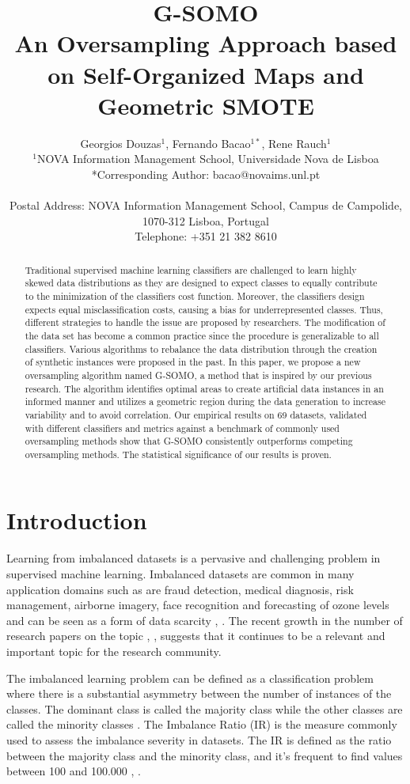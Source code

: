 \documentclass[parskip=full]{scrartcl}
\title{G-SOMO \\ \LARGE{An Oversampling Approach based on Self-Organized Maps and Geometric SMOTE}}
\author{
	Georgios Douzas\(^{1}\), Fernando Bacao\(^{1*}\), Rene Rauch\(^{1}\)
	\\
	\small{\(^{1}\)NOVA Information Management School, Universidade Nova de Lisboa}
	\\
	\small{*Corresponding Author: bacao@novaims.unl.pt}
	\\
	\\
	\small{Postal Address: NOVA Information Management School, Campus de Campolide, 1070-312 Lisboa, Portugal}
	\\
	\small{Telephone: +351 21 382 8610}
}
\date{}
\begin{document}
\maketitle

\begin{abstract}
Traditional supervised machine learning classifiers are challenged to learn
highly skewed data distributions as they are designed to expect classes to
equally contribute to the minimization of the classifiers cost function.
Moreover, the classifiers design expects equal misclassification costs, causing
a bias for underrepresented classes. Thus, different strategies to handle the
issue are proposed by researchers. The modification of the data set has become a
common practice since the procedure is generalizable to all classifiers. Various
algorithms to rebalance the data distribution through the creation of synthetic
instances were proposed in the past.  In this paper, we propose a new
oversampling algorithm named G-SOMO, a method that is inspired by our previous
research. The algorithm identifies optimal areas to create artificial data
instances in an informed manner and utilizes a geometric region during the data
generation to increase variability and to avoid correlation. Our empirical
results on 69 datasets, validated with different classifiers and metrics against
a benchmark of commonly used oversampling methods show that G-SOMO consistently
outperforms competing oversampling methods. The statistical significance of our
results is proven. 
\end{abstract}

\section{Introduction}

Learning from imbalanced datasets is a pervasive and challenging problem in
supervised machine learning. Imbalanced datasets are common in many application
domains such as are fraud detection, medical diagnosis, risk management,
airborne imagery, face recognition and forecasting of ozone levels and can be
seen as a form of data scarcity \cite{Vong2014}, \cite{He2009}. The recent
growth in the number of research papers on the topic \cite{Haixiang2017},
\cite{Fernandez2018},  suggests that it continues to be a relevant and important
topic for the research community.

The imbalanced learning problem can be defined as a classification problem where
there is a substantial asymmetry between the number of instances of the classes.
The dominant class is called the majority class while the other classes are
called the minority classes \cite{Chawla2003}. The Imbalance Ratio (IR) is the
measure commonly used to assess the imbalance severity in datasets. The IR is
defined as the ratio between the majority class and the minority class, and it’s
frequent to find values between 100 and 100.000 \cite{Chawla2002},
\cite{Barua2014}.
\end{document}
